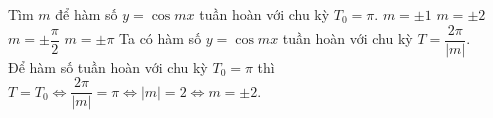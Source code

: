 \begin{ex}%
	Tìm $m$ để hàm số $y=\cos mx$ tuần hoàn với chu kỳ $T_0=\pi$.
	\choice
	{$m=\pm1$}
	{\True $m=\pm2$}
	{$m=\pm\dfrac{\pi}{2}$}
	{$m=\pm\pi$}
	\loigiai
	{
		Ta có hàm số $y=\cos mx$ tuần hoàn với chu kỳ $T=\dfrac{2\pi}{|m|}$.\\
		Để hàm số tuần hoàn với chu kỳ $T_0=\pi$ thì $T=T_0\Leftrightarrow \dfrac{2\pi}{|m|}=\pi\Leftrightarrow |m|=2\Leftrightarrow m=\pm2$.
	}
\end{ex}
